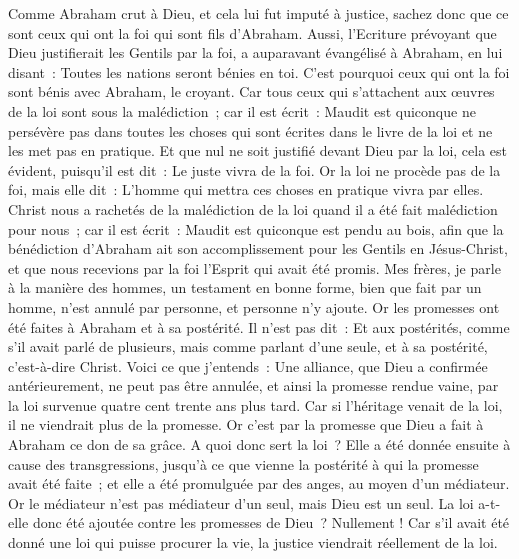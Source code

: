 \begin{multicols}{2}
Comme Abraham crut à Dieu, et cela lui fut imputé à justice,
sachez donc que ce sont ceux qui ont la foi qui sont fils d'Abraham.
Aussi, l'Ecriture prévoyant que Dieu justifierait les Gentils par la foi, a auparavant évangélisé à Abraham, en lui disant~: Toutes les nations seront bénies en toi.
C'est pourquoi ceux qui ont la foi sont bénis avec Abraham, le croyant.
Car tous ceux qui s'attachent aux œuvres de la loi sont sous la malédiction~; car il est écrit~: Maudit est quiconque ne persévère pas dans toutes les choses qui sont écrites dans le livre de la loi et ne les met pas en pratique.
Et que nul ne soit justifié devant Dieu par la loi, cela est évident, puisqu'il est dit~: Le juste vivra de la foi.
Or la loi ne procède pas de la foi, mais elle dit~: L'homme qui mettra ces choses en pratique vivra par elles.
Christ nous a rachetés de la malédiction de la loi quand il a été fait malédiction pour nous~; car il est écrit~: Maudit est quiconque est pendu au bois,
afin que la bénédiction d'Abraham ait son accomplissement pour les Gentils en Jésus-Christ, et que nous recevions par la foi l'Esprit qui avait été promis.
Mes frères, je parle à la manière des hommes, un testament en bonne forme, bien que fait par un homme, n'est annulé par personne, et personne n'y ajoute.
Or les promesses ont été faites à Abraham et à sa postérité. Il n'est pas dit~: Et aux postérités, comme s'il avait parlé de plusieurs, mais comme parlant d'une seule, et à sa postérité, c'est-à-dire Christ.
Voici ce que j'entends~: Une alliance, que Dieu a confirmée antérieurement, ne peut pas être annulée, et ainsi la promesse rendue vaine, par la loi survenue quatre cent trente ans plus tard.
Car si l'héritage venait de la loi, il ne viendrait plus de la promesse. Or c'est par la promesse que Dieu a fait à Abraham ce don de sa grâce.
A quoi donc sert la loi~? Elle a été donnée ensuite à cause des transgressions, jusqu'à ce que vienne la postérité à qui la promesse avait été faite~; et elle a été promulguée par des anges, au moyen d'un médiateur.
Or le médiateur n'est pas médiateur d'un seul, mais Dieu est un seul.
La loi a-t-elle donc été ajoutée contre les promesses de Dieu~? Nullement ! Car s'il avait été donné une loi qui puisse procurer la vie, la justice viendrait réellement de la loi.

\end{multicols}
